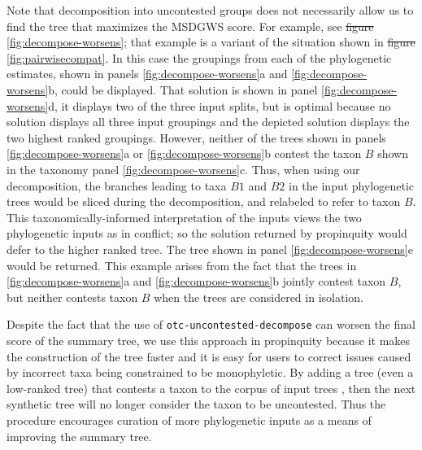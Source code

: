\documentclass[fleqn,12pt,lineno,english]{wlpeerj}
\providecommand{\DIFaddtex}[1]{{\protect\color{blue}\uwave{#1}}} %
\providecommand{\DIFdeltex}[1]{{\protect\color{red}\sout{#1}}}                      %
\providecommand{\DIFaddbegin}{} %
\providecommand{\DIFaddend}{} %
\providecommand{\DIFdelbegin}{} %
\providecommand{\DIFdelend}{} %
\providecommand{\DIFadd}[1]{\texorpdfstring{\DIFaddtex{#1}}{#1}} %
\providecommand{\DIFdel}[1]{\texorpdfstring{\DIFdeltex{#1}}{}} %
\begin{document}
Note that decomposition into uncontested groups does not necessarily
allow us to find the tree that maximizes the MSDGWS score. For example,
see \DIFdelbegin \DIFdel{figure }\DIFdelend \DIFaddbegin \DIFadd{Fig. }\DIFaddend \ref{fig:decompose-worsens}; that example is a variant
of the situation shown in \DIFdelbegin \DIFdel{figure }\DIFdelend \DIFaddbegin \DIFadd{Fig. }\DIFaddend \ref{fig:pairwisecompat}. In this
case the groupings from each of the phylogenetic estimates, shown
in panels \ref{fig:decompose-worsens}a and \ref{fig:decompose-worsens}b,
could be displayed. That solution is shown in panel \ref{fig:decompose-worsens}d,
it displays two of the three input splits, but is optimal because
no solution displays all three input groupings and the depicted solution
displays the two highest ranked groupings. However, neither of the
trees shown in panels \ref{fig:decompose-worsens}a or \ref{fig:decompose-worsens}b
contest the taxon $B$ shown in the taxonomy panel \ref{fig:decompose-worsens}c.
Thus, when using our decomposition, the branches leading to taxa $B1$
and $B2$ in the input phylogenetic trees would be sliced during the
decomposition, and relabeled to refer to taxon $B$. This taxonomically-informed
interpretation of the inputs views the two phylogenetic inputs as
in conflict; so the solution returned by propinquity would defer to
the higher ranked tree. The tree shown in panel \ref{fig:decompose-worsens}e
would be returned. This example arises from the fact that the trees
in \ref{fig:decompose-worsens}a and \ref{fig:decompose-worsens}b
jointly contest taxon $B$, but neither contests taxon $B$ when the
trees are considered in isolation.

Despite the fact that the use of \texttt{otc-uncontested-decompose}
can worsen the final score of the summary tree, we use this approach
in propinquity because it makes the construction of the tree faster
and it is easy for users to correct issues caused by incorrect taxa
being constrained to be monophyletic. By adding a tree (even a low-ranked
tree) that contests a taxon to the corpus of input trees , then the
next synthetic tree will no longer consider the taxon to be uncontested.
Thus the procedure encourages curation of more phylogenetic inputs
as a means of improving the summary tree. 
\end{document}
